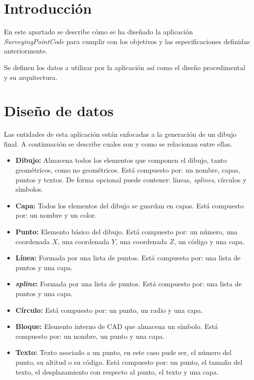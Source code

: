 
\section{Introducción}
En este apartado se describe cómo se ha diseñado la aplicación \emph{SurveyingPointCode} para cumplir con los objetivos y las especificaciones definidas anteriormente.

Se definen los datos a utilizar por la aplicación así como el diseño procedimental y su arquitectura.
\section{Diseño de datos}

Las entidades de esta aplicación están enfocadas a la generación de un dibujo final. A continuación se describe cuales son y como se relacionan entre ellas. 


\begin{itemize}

\item \textbf{Dibujo:} Almacena todos los elementos que componen el dibujo, tanto geométricos, como no geométricos. Está compuesto por: un nombre, capas, puntos y textos. De forma opcional puede contener: líneas, \emph{splines}, círculos y símbolos.

\item \textbf{Capa:} Todos los elementos del dibujo se guardan en capas. Está compuesto por: un nombre y un color.

\item \textbf{Punto:} Elemento básico del dibujo. Está compuesto por: un número, una coordenada $X$, una coordenada $Y\!$, una coordenada $Z$, un código y una capa.

\item \textbf{Línea:} Formada por una lista de puntos. Está compuesto por: una lista de puntos y una capa.

\item \textbf{\emph{spline}:} Formada por una lista de puntos. Está compuesto por: una lista de puntos y una capa.

\item \textbf{Círculo:} Está compuesto por: un punto, un radio y una capa.

\item \textbf{Bloque:} Elemento interno de CAD que almacena un símbolo. Está compuesto por: un nombre, un punto y una capa.

\item \textbf{Texto:} Texto asociado a un punto, en este caso pude ser, el número del punto, su altitud o su código. Está compuesto por: un punto, el tamaño del texto, el desplazamiento con respecto al punto, el texto y una capa.

\end{itemize}

